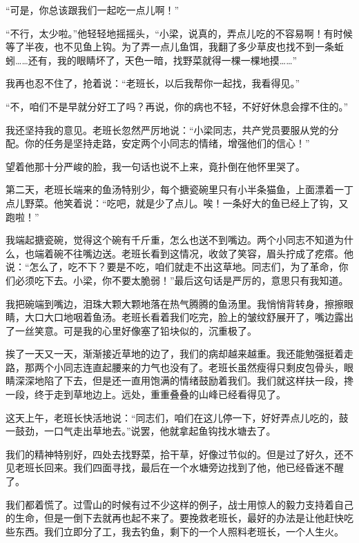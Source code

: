 \documentclass[12pt,UTF-8,openany]{ctexbook}
\begin{document}
\begin{large}
    “可是，你总该跟我们一起吃一点儿啊！”
    
    “不行，太少啦。”他轻轻地摇摇头，“小梁，说真的，弄点儿吃的不容易啊！有时候等了半夜，也不见鱼上钩。为了弄一点儿鱼饵，我翻了多少草皮也找不到一条蚯蚓……还有，我的眼睛坏了，天色一暗，找野菜就得一棵一棵地摸……”
    
    我再也忍不住了，抢着说：“老班长，以后我帮你一起找，我看得见。”
    
    “不，咱们不是早就分好工了吗？再说，你的病也不轻，不好好休息会撑不住的。”
    
    我还坚持我的意见。老班长忽然严厉地说：“小梁同志，共产党员要服从党的分配。你的任务是坚持走路，安定两个小同志的情绪，增强他们的信心！”
    
    望着他那十分严峻的脸，我一句话也说不上来，竟扑倒在他怀里哭了。
    
    第二天，老班长端来的鱼汤特别少，每个搪瓷碗里只有小半条猫鱼，上面漂着一丁点儿野菜。他笑着说：“吃吧，就是少了点儿。唉！一条好大的鱼已经上了钩，又跑啦！”
    
    我端起搪瓷碗，觉得这个碗有千斤重，怎么也送不到嘴边。两个小同志不知道为什么，也端着碗不往嘴边送。老班长看到这情况，收敛了笑容，眉头拧成了疙瘩。他说：“怎么了，吃不下？要是不吃，咱们就走不出这草地。同志们，为了革命，你们必须吃下去。小梁，你不要太脆弱！”最后这句话是严厉的，意思只有我知道。
    
    我把碗端到嘴边，泪珠大颗大颗地落在热气腾腾的鱼汤里。我悄悄背转身，擦擦眼睛，大口大口地咽着鱼汤。老班长看着我们吃完，脸上的皱纹舒展开了，嘴边露出了一丝笑意。可是我的心里好像塞了铅块似的，沉重极了。
    
    挨了一天又一天，渐渐接近草地的边了，我们的病却越来越重。我还能勉强挺着走路，那两个小同志连直起腰来的力气也没有了。老班长虽然瘦得只剩皮包骨头，眼睛深深地陷了下去，但是还一直用饱满的情绪鼓励着我们。我们就这样扶一段，搀一段，终于走到草地边上。远处，重重叠叠的山峰已经看得见了。
    
    这天上午，老班长快活地说：“同志们，咱们在这儿停一下，好好弄点儿吃的，鼓一鼓劲，一口气走出草地去。”说罢，他就拿起鱼钩找水塘去了。
    
    我们的精神特别好，四处去找野菜，拾干草，好像过节似的。但是过了好久，还不见老班长回来。我们四面寻找，最后在一个水塘旁边找到了他，他已经昏迷不醒了。
    
    我们都着慌了。过雪山的时候有过不少这样的例子，战士用惊人的毅力支持着自己的生命，但是一倒下去就再也起不来了。要挽救老班长，最好的办法是让他赶快吃些东西。我们立即分了工，我去钓鱼，剩下的一个人照料老班长，一个人生火。
    

\end{large}
\end{document}
